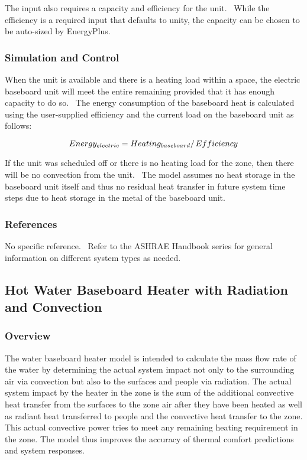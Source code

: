 The input also requires a capacity and efficiency for the unit.~ While the efficiency is a required input that defaults to unity, the capacity can be chosen to be auto-sized by EnergyPlus.

\subsubsection{Simulation and Control}\label{simulation-and-control-1-000}

When the unit is available and there is a heating load within a space, the electric baseboard unit will meet the entire remaining provided that it has enough capacity to do so.~ The energy consumption of the baseboard heat is calculated using the user-supplied efficiency and the current load on the baseboard unit as follows:

\begin{equation}
Energ{y_{electric}} = {{Heatin{g_{baseboard}}} \mathord{\left/ {\vphantom {{Heatin{g_{baseboard}}} {Efficiency}}} \right. } {Efficiency}}
\end{equation}

If the unit was scheduled off or there is no heating load for the zone, then there will be no convection from the unit.~ The model assumes no heat storage in the baseboard unit itself and thus no residual heat transfer in future system time steps due to heat storage in the metal of the baseboard unit.

\subsubsection{References}\label{references-1-002}

No specific reference.~ Refer to the ASHRAE Handbook series for general information on different system types as needed.

\subsection{Hot Water Baseboard Heater with Radiation and Convection}\label{hot-water-baseboard-heater-with-radiation-and-convection}

\subsubsection{Overview}\label{overview-2-002}

The water baseboard heater model is intended to calculate the mass flow rate of the water by determining the actual system impact not only to the surrounding air via convection but also to the surfaces and people via radiation. The actual system impact by the heater in the zone is the sum of the additional convective heat transfer from the surfaces to the zone air after they have been heated as well as radiant heat transferred to people and the convective heat transfer to the zone. This actual convective power tries to meet any remaining heating requirement in the zone. The model thus improves the accuracy of thermal comfort predictions and system responses.

